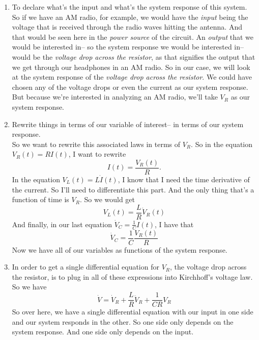 \begin{enumerate}[label=Step.\arabic*]
\item To declare what's the input and what's the system response of this system.\\
  So if we have an AM radio, for example,
  we would have the \textit{input} being the voltage that
  is received through the radio waves hitting the antenna.
  And that would be seen here in the \textit{power source} of the circuit.
  An \textit{output} that we would be interested in-- so the system
  response we would be interested in--
  would be the \textit{voltage drop across the resistor},
  as that signifies the output that we
  get through our headphones in an AM radio.
  So in our case, we will look at the system response
  of the \emph{voltage drop across the resistor}.
  We could have chosen any of the voltage drops or even
  the current as our system response.
  But because we're interested in analyzing an AM radio,
  we'll take $V_R$ as our system response.\\
\item  Rewrite things  in terms of our variable of interest--
  in terms of our system response.\\
  So we want to rewrite this associated laws in terms of $V _R$.
  So in the equation $ V_R(t) = R I(t)$, I want to rewrite
  \begin{equation*}
    I(t) = \frac{V _R (t)}{R}. 
  \end{equation*}
  In the equation $V _L(t) = L \dot I (t)$,
  I know that I need the time derivative of the current.
  So I'll need to differentiate this part.
  And the only thing that's a function of time is $V _R$.
  So we would get
  \begin{equation*}
    V _L (t) = \frac{L}{R} \dot V _R (t)
  \end{equation*}
  And finally, in our last equation $\dot V _C = \frac{1}{C} I(t)$,
  I have that
  \begin{equation*}
    \dot V _C = \frac{1}{C} \frac{V _R(t)}{R}
  \end{equation*}
  Now we have all of our variables as functions of the system response.

  \item In order to get a single differential equation
  for $V _R$, the voltage drop across the resistor,
  is to plug in all of these expressions into Kirchhoff's voltage law.
  So we have
  \begin{equation*}
    \dot V = \dot V _R + \frac{L}{R} \ddot V _R + \frac{1}{CR} V _R
  \end{equation*}
  So over here, we have a single differential equation
  with our input in one side and our system
  responds in the other.
  So one side only depends on the system response.
  And one side only depends on the input.\\


\end{enumerate}
